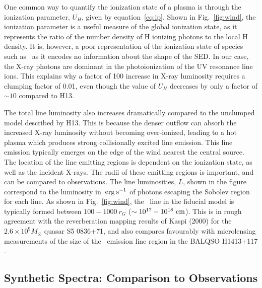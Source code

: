 One common way to quantify the ionization state of a plasma
is through the ionization parameter, $U_H$, given by equation~\ref{eq:ip}.
Shown in Fig.~\ref{fig:wind},
the ionization parameter is a useful measure of the global ionization state,
as it represents the ratio of the number density of 
H ionizing photons to the local H density.
It is, however, a poor representation of the 
ionization state of species such as \civ\ as it encodes no information
about the shape of the SED. In our case, the X-ray photons 
are dominant in the photoionization of the UV resonance line ions. 
This explains why a factor of 100 increase in X-ray luminosity requires
a clumping factor of 0.01, even though the value of $U_H$ decreases by only a factor of $\sim10$ compared to H13. 

The total line luminosity also increases dramatically compared to the unclumped model
described by H13. This is because the denser outflow can absorb the increased
X-ray luminosity without becoming over-ionized, leading to a hot plasma which
produces strong collisionally excited line emission.
This line emission typically emerges on the edge of the wind
nearest the central source. The location of the line emitting regions
is dependent on the ionization state, as well as the incident X-rays.
The radii of these emitting regions is important,
and can be compared to observations. The line luminosities, $L$,
shown in the figure correspond to the luminosity in $\:{\rm erg\:s^{-1}}$ of photons
escaping the Sobolev region for each line. 
As shown in Fig.~\ref{fig:wind},
the \civline\ line in the fiducial model is typically formed between 
$100-1000~r_G$ ($\sim10^{17}-10^{18}~\rm{cm}$).
This is in rough agreement with the reverberation mapping 
results of Kaspi (2000) for the $2.6\times10^{9} M_\odot$ quasar S5 0836+71,
and also compares favourably with microlensing measurements of the size of the
\civline\ emission line region in the BALQSO H1413+117 \citep{odowd2015}.


\subsection{Synthetic Spectra: Comparison to Observations}

